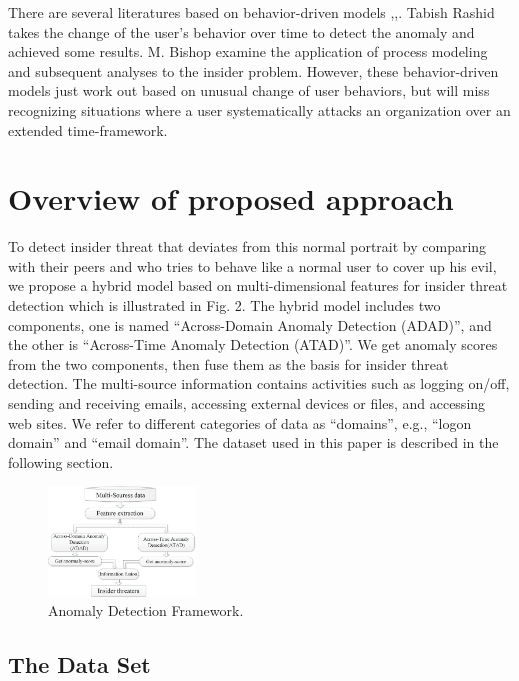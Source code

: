 \documentclass[conference]{IEEEtran}
\begin{document}
There are several literatures based on behavior-driven models \cite{b7},\cite{b11},\cite{b12}. 
Tabish Rashid \cite{b17} takes the change of the user's behavior over time to detect the anomaly and achieved some results. M. Bishop \cite{b11} examine the application of process modeling
and subsequent analyses to the insider problem. 
However, these behavior-driven models just work out based on unusual change of user behaviors, but will miss recognizing situations where a user systematically attacks an organization over an extended time-framework.



\section{Overview of proposed approach}
To detect insider threat that deviates from this
normal portrait by comparing with their peers and who tries to behave like a normal user to cover up his evil,
we propose a hybrid model based on multi-dimensional features for insider threat detection which is illustrated in Fig. 2. The hybrid model includes two components, one is named ``Across-Domain Anomaly Detection (ADAD)'', and the other is ``Across-Time Anomaly Detection (ATAD)''. We get anomaly scores from the two components, then fuse them as the basis for insider threat detection.  The multi-source information contains activities such as logging on/off, sending and receiving emails, accessing external devices or files, and
accessing web sites. We refer to different categories of data as “domains”, e.g., “logon domain” and “email domain”. The dataset used in this paper is described in the following section. 


\begin{figure}[htb]
\centerline{\includegraphics[width = 0.35\textwidth]{figure/figure2.eps}}
\caption{Anomaly Detection Framework.}
\label{fig}
\end{figure}

\subsection{The Data Set}
\end{document}
